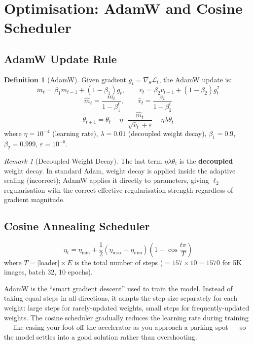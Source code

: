 \documentclass[12pt,a4paper]{article}
\theoremstyle{definition}
\newtheorem{definition}{Definition}[section]
\theoremstyle{plain}
\theoremstyle{remark}
\newtheorem{remark}{Remark}[section]
\newcommand{\Loss}{\mathcal{L}}
\begin{document}
\section{Optimisation: AdamW and Cosine Scheduler}

\subsection{AdamW Update Rule}

\begin{definition}[AdamW]
Given gradient $g_t = \nabla_\theta \Loss_t$, the AdamW update is:
\[
  m_t = \beta_1 m_{t-1} + (1-\beta_1) g_t, \qquad v_t = \beta_2 v_{t-1} + (1-\beta_2)g_t^2
\]
\[
  \hat{m}_t = \frac{m_t}{1-\beta_1^t}, \qquad \hat{v}_t = \frac{v_t}{1-\beta_2^t}
\]
\[
  \boxed{\theta_{t+1} = \theta_t - \eta \cdot \frac{\hat{m}_t}{\sqrt{\hat{v}_t}+\varepsilon} - \eta\lambda\theta_t}
\]
where $\eta = 10^{-4}$ (learning rate), $\lambda = 0.01$ (decoupled weight decay),
$\beta_1 = 0.9$, $\beta_2 = 0.999$, $\varepsilon = 10^{-8}$.
\end{definition}

\begin{remark}[Decoupled Weight Decay]
The last term $\eta\lambda\theta_t$ is the \textbf{decoupled} weight decay.
In standard Adam, weight decay is applied inside the adaptive scaling (incorrect);
AdamW applies it directly to parameters, giving $\ell_2$ regularisation with the
correct effective regularisation strength regardless of gradient magnitude.
\end{remark}

\subsection{Cosine Annealing Scheduler}

\[
  \eta_t = \eta_{\min} + \frac{1}{2}(\eta_{\max} - \eta_{\min})\left(1 + \cos\!\frac{t\pi}{T}\right)
\]
where $T = |\text{loader}| \times E$ is the total number of steps
($= 157 \times 10 = 1570$ for 5K images, batch 32, 10 epochs).

\begin{tcolorbox}[laymanbox]
AdamW is the ``smart gradient descent'' used to train the model.
Instead of taking equal steps in all directions, it adapts the step size
separately for each weight: large steps for rarely-updated weights,
small steps for frequently-updated weights. The cosine scheduler gradually
reduces the learning rate during training — like easing your foot off the
accelerator as you approach a parking spot — so the model settles into a
good solution rather than overshooting.
\end{tcolorbox}
\end{document}
